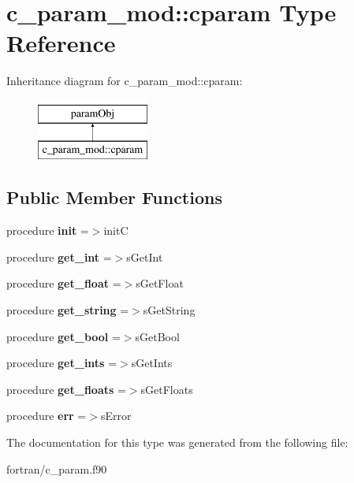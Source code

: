 \hypertarget{structc__param__mod_1_1cparam}{}\section{c\+\_\+param\+\_\+mod\+:\+:cparam Type Reference}
\label{structc__param__mod_1_1cparam}
Inheritance diagram for c\+\_\+param\+\_\+mod\+:\+:cparam\+:\begin{figure}[H]
\begin{center}
\leavevmode
\includegraphics[height=2.000000cm]{structc__param__mod_1_1cparam}
\end{center}
\end{figure}
\subsection*{Public Member Functions}
\begin{DoxyCompactItemize}
\item 
\mbox{\label{structc__param__mod_1_1cparam_aaafd33bbc003fffe1a3edfce07459825}} 
procedure {\bfseries init} =$>$initC
\item 
\mbox{\label{structc__param__mod_1_1cparam_a6e3444b8a19b9447088154b7fc5cbae4}} 
procedure {\bfseries get\+\_\+int} =$>$s\+Get\+Int
\item 
\mbox{\label{structc__param__mod_1_1cparam_af5fe629b187b94d2a6bdb0a8c69fcf23}} 
procedure {\bfseries get\+\_\+float} =$>$s\+Get\+Float
\item 
\mbox{\label{structc__param__mod_1_1cparam_abc832e22b9c49c23a62bec5cfe83903f}} 
procedure {\bfseries get\+\_\+string} =$>$s\+Get\+String
\item 
\mbox{\label{structc__param__mod_1_1cparam_ac2f93240e73a083df013e27d81b42d4d}} 
procedure {\bfseries get\+\_\+bool} =$>$s\+Get\+Bool
\item 
\mbox{\label{structc__param__mod_1_1cparam_a4323cad48c279887655b47b479a9b31b}} 
procedure {\bfseries get\+\_\+ints} =$>$s\+Get\+Ints
\item 
\mbox{\label{structc__param__mod_1_1cparam_a8918ec555b952100904407724a62f9fc}} 
procedure {\bfseries get\+\_\+floats} =$>$s\+Get\+Floats
\item 
\mbox{\label{structc__param__mod_1_1cparam_a1484c4335a8e8bcdbc9bb7b8fd2a2948}} 
procedure {\bfseries err} =$>$s\+Error
\end{DoxyCompactItemize}


The documentation for this type was generated from the following file\+:\begin{DoxyCompactItemize}
\item 
fortran/c\+\_\+param.\+f90\end{DoxyCompactItemize}

